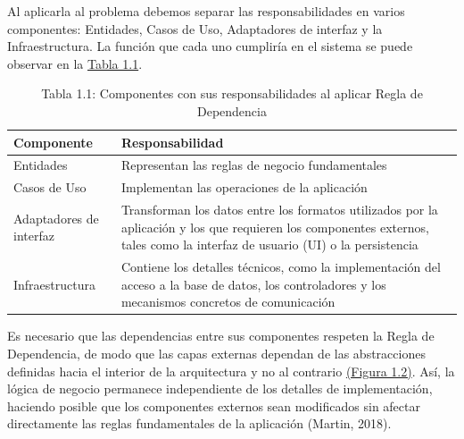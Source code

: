 \documentclass[12pt, a4paper]{article}
\begin{document}
        Al aplicarla al problema debemos separar las responsabilidades en varios componentes: Entidades, Casos de Uso, Adaptadores de interfaz y la Infraestructura. La función que cada uno cumpliría en el sistema se puede observar en la \hyperref[tab:Tabla1.1]{Tabla 1.1}.

        \begin{table}[H]
            \centering

            \begin{tabular}{|l|p{10cm}|}
                \toprule
                Componente &Responsabilidad\\
                \midrule
                Entidades&Representan las reglas de negocio fundamentales\\
                Casos de Uso&Implementan las operaciones de la aplicación\\
                Adaptadores de interfaz&Transforman los datos entre los formatos utilizados por la aplicación y los que requieren los componentes externos, tales como la interfaz de usuario (UI) o la persistencia\\
                Infraestructura&Contiene los detalles técnicos, como la implementación del acceso a la base de datos, los controladores y los mecanismos concretos de comunicación\\
                \bottomrule

            \end{tabular}
            \caption*{Tabla 1.1: Componentes con sus responsabilidades al aplicar Regla de Dependencia}
            \label{tab:Tabla1.1}
        \end{table}
        
        Es necesario que las dependencias entre sus componentes respeten la Regla de Dependencia, de modo que las capas externas dependan de las abstracciones definidas hacia el interior de la arquitectura y no al contrario \hyperref[fig:Figura1.2]{(Figura 1.2)}. Así, la lógica de negocio permanece independiente de los detalles de implementación, haciendo posible que los componentes externos sean modificados sin afectar directamente las reglas fundamentales de la aplicación (Martin, 2018).
\end{document}
